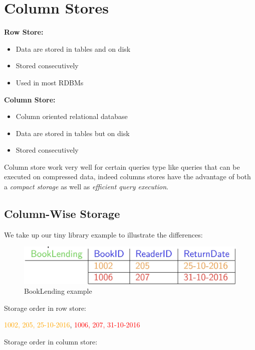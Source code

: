 \chapter{Column Stores}
\textbf{Row Store:}
\begin{itemize}
    \item Data are stored in tables and on disk
    \item Stored consecutively
    \item Used in most RDBMs
\end{itemize}
\textbf{Column Store:}
\begin{itemize}
    \item Column oriented relational database
    \item Data are stored in tables but on disk
    \item Stored consecutively
\end{itemize}
Column store work very well for certain queries type like queries that can be executed on compressed data, indeed columns stores have the advantage of both a \textit{compact storage} as well as \textit{efficient query execution}.

\section{Column-Wise Storage}
We take up our tiny library example to illustrate the differences:
\begin{figure}[!hbp]
    \centering
    \includegraphics[width=0.60\linewidth]{images/AdvancedDataManagment/column_stores/library_example.jpeg}
    \caption{BookLending example}
\end{figure}

Storage order in row store:

\centerline{\textcolor{orange}{1002, 205, 25-10-2016}, \textcolor{red}{1006, 207, 31-10-2016}}

Storage order in column store:

